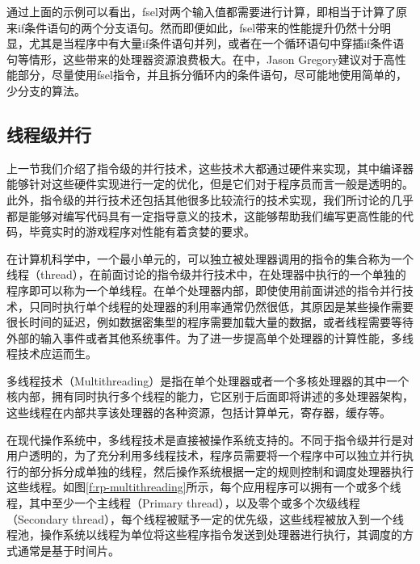 通过上面的示例可以看出，fsel对两个输入值都需要进行计算，即相当于计算了原来if条件语句的两个分支语句。然而即便如此，fsel带来的性能提升仍然十分明显，尤其是当程序中有大量if条件语句并列，或者在一个循环语句中穿插if条件语句等情形，这些带来的处理器资源浪费极大。在\cite{a:DoggedDetermination:TechnologyandProcessatNaughtyDogInc.}中，Jason Gregory建议对于高性能部分，尽量使用fsel指令，并且拆分循环内的条件语句，尽可能地使用简单的，少分支的算法。






\subsection{线程级并行}
上一节我们介绍了指令级的并行技术，这些技术大都通过硬件来实现，其中编译器能够针对这些硬件实现进行一定的优化，但是它们对于程序员而言一般是透明的。此外，指令级的并行技术还包括其他很多比较流行的技术实现，我们所讨论的几乎都是能够对编写代码具有一定指导意义的技术，这能够帮助我们编写更高性能的代码，毕竟实时的游戏程序对性能有着贪婪的要求。

在计算机科学中，一个最小单元的，可以独立被处理器调用的指令的集合称为一个线程（thread），在前面讨论的指令级并行技术中，在处理器中执行的一个单独的程序即可以称为一个单线程。在单个处理器内部，即使使用前面讲述的指令并行技术，只同时执行单个线程的处理器的利用率通常仍然很低，其原因是某些操作需要很长时间的延迟，例如数据密集型的程序需要加载大量的数据，或者线程需要等待外部的输入事件或者其他系统事件。为了进一步提高单个处理器的计算性能，多线程技术应运而生。

多线程技术（Multithreading）是指在单个处理器或者一个多核处理器的其中一个核内部，拥有同时执行多个线程的能力，它区别于后面即将讲述的多处理器架构，这些线程在内部共享该处理器的各种资源，包括计算单元，寄存器，缓存等。

在现代操作系统中，多线程技术是直接被操作系统支持的。不同于指令级并行是对用户透明的，为了充分利用多线程技术，程序员需要将一个程序中可以独立并行执行的部分拆分成单独的线程，然后操作系统根据一定的规则控制和调度处理器执行这些线程。如图\ref{f:rp-multithreading}所示，每个应用程序可以拥有一个或多个线程，其中至少一个主线程（Primary thread），以及零个或多个次级线程（Secondary thread），每个线程被赋予一定的优先级，这些线程被放入到一个线程池，操作系统以线程为单位将这些程序指令发送到处理器进行执行，其调度的方式通常是基于时间片。


